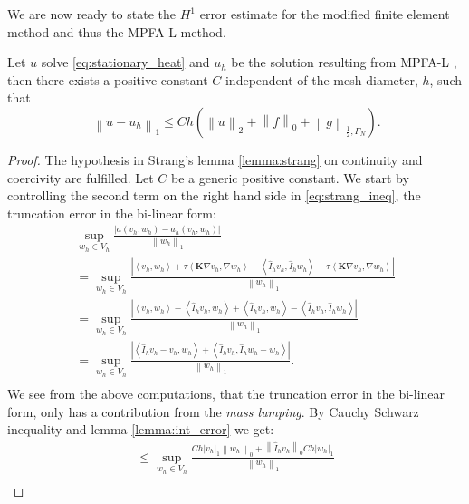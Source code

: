 \documentclass[../Main/main.tex]{subfiles}
\begin{document}
	We are now ready to state the $H^1$ error estimate for the modified finite element method and thus the MPFA-L method.
	\begin{theorem}\label{th:convergence of elliptic}
		Let $u$ solve \eqref{eq:stationary_heat} and $u_h$ be the solution resulting from MPFA-L , then there exists a positive constant $C$ independent of the mesh diameter, $h$, such that
		\begin{equation}\
			\left \|u - u_h \right \|_1 \leq C h (\left \| u \right \|_2 + \left \| f \right \|_0 + \left \| g \right \|_{\frac{1}{2},\Gamma_N}).
		\end{equation}
	\end{theorem}
	\begin{proof}
		The hypothesis in Strang's lemma \ref{lemma:strang} on continuity and coercivity are fulfilled. Let $C$ be a generic positive constant.
		We start by controlling the second term on the right hand side in \eqref{eq:strang_ineq}, the truncation error in the bi-linear form:
		\begin{equation}
			\begin{gathered}
				\sup_{w_h\in V_h} \frac{|a(v_h,w_h)-a_h(v_h,w_h)|}{\left \|w_h \right \|_1} \\
				=\sup_{w_h\in V_h} \frac{|\left \langle v_h,w_h\right \rangle + \tau \left \langle\bm{K} \nabla v_h,\nabla w_h \right \rangle - \left \langle \hat{I}_h v_h, \hat{I}_h w_h \right \rangle - \tau \left \langle\bm{K} \nabla v_h, \nabla w_h \right \rangle|}{\left \| w_h \right \|_1} \\
				=\sup_{w_h\in V_h} \frac{|\left \langle v_h,w_h\right \rangle - \left \langle \hat{I}_h v_h, w_h \right \rangle + \left \langle \hat{I}_h v_h, w_h \right \rangle - \left \langle \hat{I}_h v_h, \hat{I}_h w_h \right \rangle|}{\left \| w_h \right \|_1}\\
				= \sup_{w_h\in V_h}\frac{|\left \langle \hat{I}_h v_h - v_h,w_h \right \rangle + \left \langle \hat{I}_h v_h, \hat{I}_h w_h - w_h \right \rangle |}{\left \| w_h \right \|_1}. \\
			\end{gathered}
		\end{equation}
		We see from the above computations, that the truncation error in the bi-linear form, only has a contribution from the \emph{mass lumping}.
		By Cauchy Schwarz inequality and lemma \ref{lemma:int_error} we get:
		\begin{equation}
			\begin{gathered}
				\leq \sup_{w_h\in V_h}\frac{Ch| v_h|_1\left \| w_h \right \|_0  + \left \|\hat{I}_h v_h\right \|_0 Ch|w_h|_1}{\left \| w_h \right \|_1}\\

\end{gathered}
\end{equation}
\end{proof}
\end{document}
